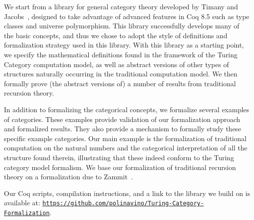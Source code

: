 \documentclass{entcs} \usepackage{entcsmacro}
\begin{document}
We start from a library for general category theory developed by
Timany and Jacobs~\cite{timanyNewLib}, designed to take advantage of
advanced features in Coq 8.5 such as type classes and universe
polymorphism.  This library successfully develops many of the basic
concepts, and thus we chose to adopt the style of definitions and
formalization strategy used in this library.  With this library as a
starting point, we specify the mathematical definitions found in the
framework of the Turing Category computation model, as well as
abstract versions of other types of structures naturally occurring in
the traditional computation model.  We then formally prove (the
abstract versions of) a number of results from traditional recursion
theory.


In addition to formalizing the categorical concepts, we formalize
several examples of categories. These examples provide validation
of our formalization approach and formalized results.  They also
provide a mechanism to formally study these specific example
categories. Our main example is the formalization of traditional
computation on the natural numbers and the categorical interpretation
of all the structure found therein, illustrating that these indeed
conform to the Turing category model formalism. We base our
formalization of traditional recursion theory on a formalization due
to Zammit~\cite{SmnForm}.

Our Coq scripts, compilation instructions, and a link to the library
we build on is available at:
\href{https://github.com/polinavino/Turing-Category-Formalization}
{\texttt{https://github.com/polinavino/Turing-Category-Formalization}}.
\end{document}
